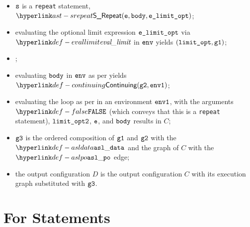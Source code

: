 \AllApply
\begin{itemize}
  \item $\vs$ is a \texttt{repeat} statement, $\SRepeat(\ve, \vbody, \velimitopt)$;
  \item evaluating the optional limit expression $\velimitopt$ via $\evallimit$ in $\env$
        yields $(\vlimitopt, \vgone)$\ProseOrError;
  \item \Proseticklooplimit{$\vlimitoptone$}{$\vlimitopttwo$}\ProseOrError;
  \item evaluating $\vbody$ in $\env$ as per 
        yields $\Continuing(\vgtwo, \envone)$\ProseTerminateAs{\ReturningConfig,\ThrowingConfig,\DynErrorConfig};
  \item evaluating the loop as per  in an environment $\envone$,
        with the arguments $\False$ (which conveys that this is a \texttt{repeat} statement),
        $\vlimitopttwo$,
        $\ve$,
        and $\vbody$
        results in $C$;
  \item $\vgthree$ is the ordered composition of $\vgone$ and $\vgtwo$ with the $\asldata$ and the graph of $C$
        with the $\aslpo$ edge;
  \item the output configuration $D$ is the output configuration $C$ with its execution graph
        substituted with $\vgthree$.
\end{itemize}
\FormallyParagraph
\begin{mathpar}
\end{mathpar}

\section{For Statements\label{sec:ForStatements}}
\hypertarget{def-forstatementterm}{}

